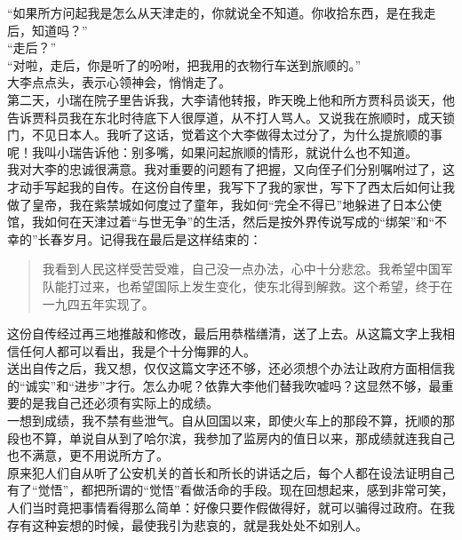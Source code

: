 “如果所方问起我是怎么从天津走的，你就说全不知道。你收拾东西，是在我走后，知道吗？”\\

“走后？”\\

“对啦，走后，你是听了的吩咐，把我用的衣物行车送到旅顺的。”\\

大李点点头，表示心领神会，悄悄走了。\\

第二天，小瑞在院子里告诉我，大李请他转报，昨天晚上他和所方贾科员谈天，他告诉贾科员我在东北时待底下人很厚道，从不打人骂人。又说我在旅顺时，成天锁门，不见日本人。我听了这话，觉着这个大李做得太过分了，为什么提旅顺的事呢！我叫小瑞告诉他：别多嘴，如果问起旅顺的情形，就说什么也不知道。\\

我对大李的忠诚很满意。我对重要的问题有了把握，又向侄子们分别嘱咐过了，这才动手写起我的自传。在这份自传里，我写下了我的家世，写下了西太后如何让我做了皇帝，我在紫禁城如何度过了童年，我如何“完全不得已”地躲进了日本公使馆，我如何在天津过着“与世无争”的生活，然后是按外界传说写成的“绑架”和“不幸的”长春岁月。记得我在最后是这样结束的：\\

\begin{quote}
	我看到人民这样受苦受难，自己没一点办法，心中十分悲忿。我希望中国军队能打过来，也希望国际上发生变化，使东北得到解救。这个希望，终于在一九四五年实现了。\\
\end{quote}

这份自传经过再三地推敲和修改，最后用恭楷缮清，送了上去。从这篇文字上我相信任何人都可以看出，我是个十分悔罪的人。\\

送出自传之后，我又想，仅仅这篇文字还不够，还必须想个办法让政府方面相信我的“诚实”和“进步”才行。怎么办呢？依靠大李他们替我吹嘘吗？这显然不够，最重要的是我自己还必须有实际上的成绩。\\

一想到成绩，我不禁有些泄气。自从回国以来，即使火车上的那段不算，抚顺的那段也不算，单说自从到了哈尔滨，我参加了监房内的值日以来，那成绩就连我自己也不满意，更不用说所方了。\\

原来犯人们自从听了公安机关的首长和所长的讲话之后，每个人都在设法证明自己有了“觉悟”，都把所谓的“觉悟”看做活命的手段。现在回想起来，感到非常可笑，人们当时竟把事情看得那么简单：好像只要作假做得好，就可以骗得过政府。在我存有这种妄想的时候，最使我引为悲哀的，就是我处处不如别人。\\

